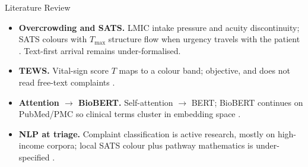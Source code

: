 \begin{frame}{Literature Review}
	\small
	\begin{itemize}
		\item \textbf{Overcrowding and SATS.} LMIC intake pressure and acuity discontinuity; SATS colours with \(T_{\max}\) structure flow when urgency travels with the patient \citep{kathsats,satsmanual}. Text-first arrival remains under-formalised.
		\item \textbf{TEWS.} Vital-sign score \(T\) maps to a colour band; objective, and does not read free-text complaints \citep{satsmanual}.
		\item \textbf{Attention \(\to\) BioBERT.} Self-attention \(\to\) BERT; BioBERT continues on PubMed/PMC so clinical terms cluster in embedding space \citep{vaswani2017attention,lee2020biobert}.
		\item \textbf{NLP at triage.} Complaint classification is active research, mostly on high-income corpora; local SATS colour plus pathway mathematics is under-specified \citep{stewart2023nlp,gligorijevic2018deep}.
	\end{itemize}
\end{frame}

